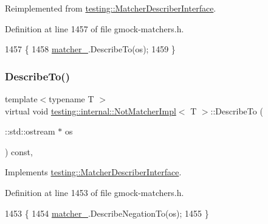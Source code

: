 Reimplemented from \hyperlink{classtesting_1_1MatcherDescriberInterface_a2071afbc47097c4d1c0064275af34db0}{testing\+::\+Matcher\+Describer\+Interface}.



Definition at line 1457 of file gmock-\/matchers.\+h.


\begin{DoxyCode}
1457                                                         \{
1458     \hyperlink{classtesting_1_1internal_1_1NotMatcherImpl_a913c0244b28d9b9227a8a7353aedb648}{matcher\_}.DescribeTo(os);
1459   \}
\end{DoxyCode}
\mbox{\label{classtesting_1_1internal_1_1NotMatcherImpl_a2c22d3e15126decd9c6af132d4f4b60f}} 
\subsubsection{\texorpdfstring{Describe\+To()}{DescribeTo()}}
{\footnotesize\ttfamily template$<$typename T $>$ \\
virtual void \hyperlink{classtesting_1_1internal_1_1NotMatcherImpl}{testing\+::internal\+::\+Not\+Matcher\+Impl}$<$ T $>$\+::Describe\+To (\begin{DoxyParamCaption}\item[{\+::std\+::ostream $\ast$}]{os }\end{DoxyParamCaption}) const\hspace{0.3cm}{\ttfamily [inline]}, {\ttfamily [virtual]}}



Implements \hyperlink{classtesting_1_1MatcherDescriberInterface_ad9f861588bd969b6e3e717f13bb94e7b}{testing\+::\+Matcher\+Describer\+Interface}.



Definition at line 1453 of file gmock-\/matchers.\+h.


\begin{DoxyCode}
1453                                                 \{
1454     \hyperlink{classtesting_1_1internal_1_1NotMatcherImpl_a913c0244b28d9b9227a8a7353aedb648}{matcher\_}.DescribeNegationTo(os);
1455   \}
\end{DoxyCode}
\mbox{\label{classtesting_1_1internal_1_1NotMatcherImpl_a9960ad99fa3345626edb650bca78ecc9}} 
